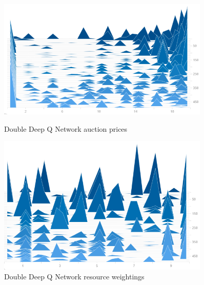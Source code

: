 \begin{figure}
    \centering
    \begin{minipage}{0.45\textwidth}
        \centering
        \includegraphics[width=0.9\textwidth]{figures/algo_training_fig/ddqn_auction_prices.png}
        \caption{Double Deep Q Network auction prices}
        \label{fig:ddqn-auction-prices}
    \end{minipage}\hfill
    \begin{minipage}{0.45\textwidth}
        \centering
        \includegraphics[width=0.9\textwidth]{figures/algo_training_fig/ddqn_weightings.png}
        \caption{Double Deep Q Network resource weightings}
        \label{fig:ddqn-resource-weightings}
    \end{minipage}
\end{figure}

